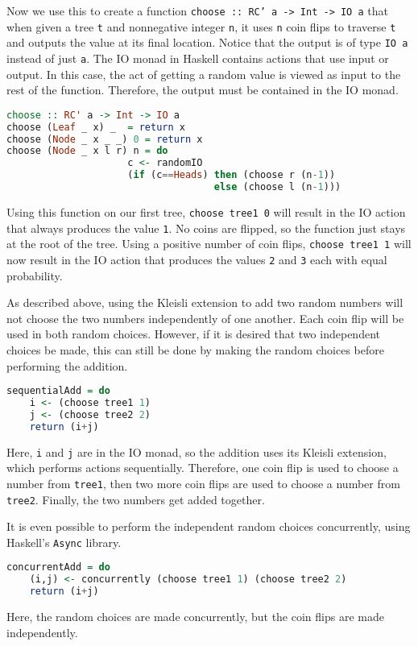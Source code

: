 Now we use this to create a function \texttt{choose :: RC' a -> Int -> IO a} that when given a tree \texttt{t} and nonnegative integer \texttt{n}, it uses \texttt{n} coin flips to traverse \texttt{t} and outputs the value at its final location.  Notice that the output is of type \texttt{IO a} instead of just \texttt{a}.  The IO monad in Haskell contains actions that use input or output.  In this case, the act of getting a random value is viewed as input to the rest of the function.  Therefore, the output must be contained in the IO monad.
\newpage
\begin{lstlisting}[language=Haskell]
choose :: RC' a -> Int -> IO a
choose (Leaf _ x) _  = return x
choose (Node _ x _ _) 0 = return x
choose (Node _ x l r) n = do
                     c <- randomIO
                     (if (c==Heads) then (choose r (n-1))
                                    else (choose l (n-1)))
\end{lstlisting}
Using this function on our first tree, \texttt{choose tree1 0} will result in the IO action that always produces the value \texttt{1}.  No coins are flipped, so the function just stays at the root of the tree.  Using a positive number of coin flips, \texttt{choose tree1 1} will now result in the IO action that produces the values \texttt{2} and \texttt{3} each with equal probability.

As described above, using the Kleisli extension to add two random numbers will not choose the two numbers independently of one another.  Each coin flip will be used in both random choices.  However, if it is desired that two independent choices be made, this can still be done by making the random choices before performing the addition.
\begin{lstlisting}[language=Haskell]
sequentialAdd = do
	i <- (choose tree1 1)
	j <- (choose tree2 2)
	return (i+j)
\end{lstlisting}
Here, \texttt{i} and \texttt{j} are in the IO monad, so the addition uses its Kleisli extension, which performs actions sequentially.  Therefore, one coin flip is used to choose a number from \texttt{tree1}, then two more coin flips are used to choose a number from \texttt{tree2}.  Finally, the two numbers get added together.

It is even possible to perform the independent random choices concurrently, using Haskell's \texttt{Async} library.
\begin{lstlisting}[language=Haskell]
concurrentAdd = do
	(i,j) <- concurrently (choose tree1 1) (choose tree2 2)
	return (i+j)
\end{lstlisting}
Here, the random choices are made concurrently, but the coin flips are made independently.

